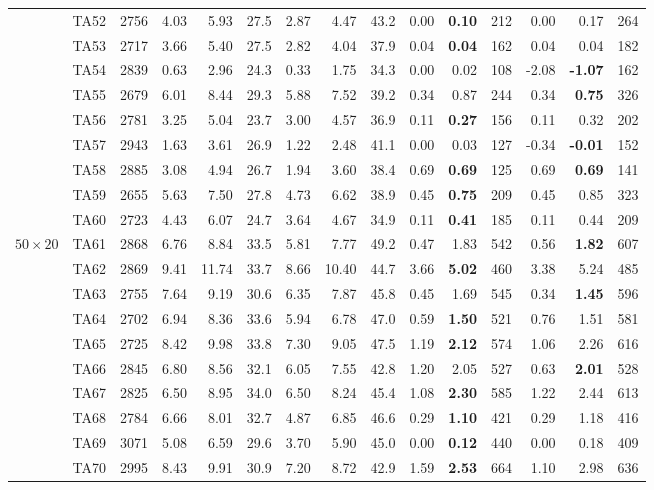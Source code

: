 \begin{table}[p]
\begin{tabular}{ll r | rr r | rr r | rr r | rr r}
 & TA52 & 2756 & 4.03 & 5.93 & 27.5 & 2.87 & 4.47 & 43.2 & 0.00 & \textbf{0.10} & 212 & 0.00 & 0.17 & 264 \\
 & TA53 & 2717 & 3.66 & 5.40 & 27.5 & 2.82 & 4.04 & 37.9 & 0.04 & \textbf{0.04} & 162 & 0.04 & 0.04 & 182 \\
 & TA54 & 2839 & 0.63 & 2.96 & 24.3 & 0.33 & 1.75 & 34.3 & 0.00 & 0.02 & 108 & -2.08 & \textbf{-1.07} & 162 \\
 & TA55 & 2679 & 6.01 & 8.44 & 29.3 & 5.88 & 7.52 & 39.2 & 0.34 & 0.87 & 244 & 0.34 & \textbf{0.75} & 326 \\
 & TA56 & 2781 & 3.25 & 5.04 & 23.7 & 3.00 & 4.57 & 36.9 & 0.11 & \textbf{0.27} & 156 & 0.11 & 0.32 & 202 \\
 & TA57 & 2943 & 1.63 & 3.61 & 26.9 & 1.22 & 2.48 & 41.1 & 0.00 & 0.03 & 127 & -0.34 & \textbf{-0.01} & 152 \\
 & TA58 & 2885 & 3.08 & 4.94 & 26.7 & 1.94 & 3.60 & 38.4 & 0.69 & \textbf{0.69} & 125 & 0.69 & \textbf{0.69} & 141 \\
 & TA59 & 2655 & 5.63 & 7.50 & 27.8 & 4.73 & 6.62 & 38.9 & 0.45 & \textbf{0.75} & 209 & 0.45 & 0.85 & 323 \\
 & TA60 & 2723 & 4.43 & 6.07 & 24.7 & 3.64 & 4.67 & 34.9 & 0.11 & \textbf{0.41} & 185 & 0.11 & 0.44 & 209 \\
\hline
$50\times20$ & TA61 & 2868 & 6.76 & 8.84 & 33.5 & 5.81 & 7.77 & 49.2 & 0.47 & 1.83 & 542 & 0.56 & \textbf{1.82} & 607 \\
 & TA62 & 2869 & 9.41 & 11.74 & 33.7 & 8.66 & 10.40 & 44.7 & 3.66 & \textbf{5.02} & 460 & 3.38 & 5.24 & 485 \\
 & TA63 & 2755 & 7.64 & 9.19 & 30.6 & 6.35 & 7.87 & 45.8 & 0.45 & 1.69 & 545 & 0.34 & \textbf{1.45} & 596 \\
 & TA64 & 2702 & 6.94 & 8.36 & 33.6 & 5.94 & 6.78 & 47.0 & 0.59 & \textbf{1.50} & 521 & 0.76 & 1.51 & 581 \\
 & TA65 & 2725 & 8.42 & 9.98 & 33.8 & 7.30 & 9.05 & 47.5 & 1.19 & \textbf{2.12} & 574 & 1.06 & 2.26 & 616 \\
 & TA66 & 2845 & 6.80 & 8.56 & 32.1 & 6.05 & 7.55 & 42.8 & 1.20 & 2.05 & 527 & 0.63 & \textbf{2.01} & 528 \\
 & TA67 & 2825 & 6.50 & 8.95 & 34.0 & 6.50 & 8.24 & 45.4 & 1.08 & \textbf{2.30} & 585 & 1.22 & 2.44 & 613 \\
 & TA68 & 2784 & 6.66 & 8.01 & 32.7 & 4.87 & 6.85 & 46.6 & 0.29 & \textbf{1.10} & 421 & 0.29 & 1.18 & 416 \\
 & TA69 & 3071 & 5.08 & 6.59 & 29.6 & 3.70 & 5.90 & 45.0 & 0.00 & \textbf{0.12} & 440 & 0.00 & 0.18 & 409 \\
 & TA70 & 2995 & 8.43 & 9.91 & 30.9 & 7.20 & 8.72 & 42.9 & 1.59 & \textbf{2.53} & 664 & 1.10 & 2.98 & 636 \\
\hline
\end{tabular}
\end{table}
